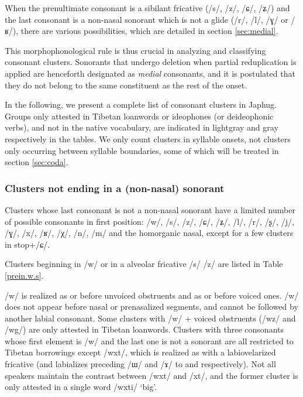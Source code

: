 \documentclass[oneside,a4paper,11pt]{article}
\newcommand{\ipa}[1]{\mbox{\phon/#1/}}
\newcommand{\phonet}[1]{\mbox{\phon[#1]}}
\begin{document}
When the prenultimate consonant is a sibilant fricative   (\ipa{s}, \ipa{z}, \ipa{ɕ}, \ipa{ʑ}) and the last consonant is a non-nasal sonorant which is not a glide (\ipa{r}, \ipa{l}, \ipa{ɣ} or \ipa{ʁ}), there are various possibilities, which are detailed in section \ref{sec:medial}.

This morphophonological rule is thus crucial in analyzing and classifying consonant clusters. Sonorants that undergo deletion when partial reduplication is applied are henceforth designated as \textit{medial} consonants, and it is postulated that they do not belong to the same constituent as the rest of the onset.

In the following, we present a complete list of consonant clusters in Japhug. Groups only attested in Tibetan loanwords or ideophones (or deideophonic verbs), and not in the native vocabulary, are indicated in lightgray and gray respectively in the tables. We only count clusters in syllable onsets, not clusters only occurring between syllable boundaries, some of which will be treated in section \ref{sec:coda}.
  
  
  \subsubsection*{Clusters not ending in a (non-nasal) sonorant}  
Clusters whose last consonant is not a non-nasal sonorant have a limited number of possible consonants in first position: \ipa{w}, \ipa{s}, \ipa{z}, \ipa{ɕ}, \ipa{ʑ}, \ipa{l}, \ipa{r}, \ipa{ʂ}, \ipa{j}, \ipa{ɣ}, \ipa{x}, \ipa{ʁ}, \ipa{χ}, \ipa{n}, \ipa{m} and the homorganic nasal, except for a few clusters in stop+\ipa{ɕ}.

 Clusters beginning in \ipa{w} or in a alveolar fricative \ipa{s} \ipa{z} are listed in Table \ref{prein.w.s}. 
 
\ipa{w} is realized as \phonet{f} or \phonet{ɸ} before unvoiced obstruents and as \phonet{v} or \phonet{β} before voiced ones. \ipa{w} does not appear before nasal or prenasalized segments, and cannot be followed by another labial consonant. Some clusters with \ipa{w} + voiced obstruents (\ipa{wz} and \ipa{wg}) are only attested in Tibetan loanwords. Clusters with three consonants whose first element is \ipa{w} and the last one is not a sonorant are all restricted to Tibetan borrowings except \ipa{wxt}, which is realized as \phonet{xʷt} with a labiovelarized fricative (and labializes preceding \ipa{ɯ} and \ipa{ɤ} to \phonet{u} and \phonet{o} respectively). Not all speakers maintain the contrast between \ipa{wxt} and \ipa{xt}, and the former cluster is only attested in a single word \ipa{wxti} `big'.
 
\end{document}
